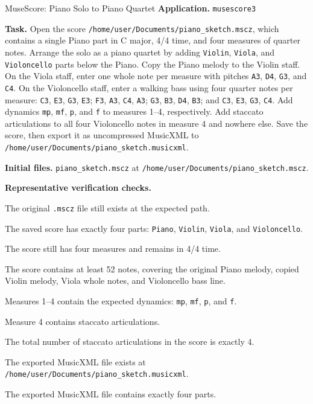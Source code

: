 \documentclass{llmxive}
\providecommand{\taskfield}[1]{\vspace{0.25em}\noindent\textbf{#1.}}
\begin{document}
\begin{taskexample}{MuseScore: Piano Solo to Piano Quartet}
\taskfield{Application} \texttt{musescore3}

\taskfield{Task} Open the score
\texttt{/home/user/Documents/piano\_sketch.mscz}, which contains a single
Piano part in C major, 4/4 time, and four measures of quarter notes. Arrange
the solo as a piano quartet by adding \texttt{Violin}, \texttt{Viola}, and
\texttt{Violoncello} parts below the Piano. Copy the Piano melody to the
Violin staff. On the Viola staff, enter one whole note per measure with pitches
\texttt{A3}, \texttt{D4}, \texttt{G3}, and \texttt{C4}. On the Violoncello
staff, enter a walking bass using four quarter notes per measure:
\texttt{C3}, \texttt{E3}, \texttt{G3}, \texttt{E3};
\texttt{F3}, \texttt{A3}, \texttt{C4}, \texttt{A3};
\texttt{G3}, \texttt{B3}, \texttt{D4}, \texttt{B3};
and \texttt{C3}, \texttt{E3}, \texttt{G3}, \texttt{C4}. Add dynamics
\texttt{mp}, \texttt{mf}, \texttt{p}, and \texttt{f} to measures 1--4,
respectively. Add staccato articulations to all four Violoncello notes in
measure 4 and nowhere else. Save the score, then export it as uncompressed
MusicXML to \texttt{/home/user/Documents/piano\_sketch.musicxml}.

\taskfield{Initial files}
\texttt{piano\_sketch.mscz} at
\texttt{/home/user/Documents/piano\_sketch.mscz}.

\taskfield{Representative verification checks}
\begin{compactitem}
    \item The original \texttt{.mscz} file still exists at the expected path.
    \item The saved score has exactly four parts: \texttt{Piano},
    \texttt{Violin}, \texttt{Viola}, and \texttt{Violoncello}.
    \item The score still has four measures and remains in 4/4 time.
    \item The score contains at least 52 notes, covering the original Piano
    melody, copied Violin melody, Viola whole notes, and Violoncello bass line.
    \item Measures 1--4 contain the expected dynamics:
    \texttt{mp}, \texttt{mf}, \texttt{p}, and \texttt{f}.
    \item Measure 4 contains staccato articulations.
    \item The total number of staccato articulations in the score is exactly 4.
    \item The exported MusicXML file exists at
    \texttt{/home/user/Documents/piano\_sketch.musicxml}.
    \item The exported MusicXML file contains exactly four parts.
\end{compactitem}
\end{taskexample}
\end{document}
